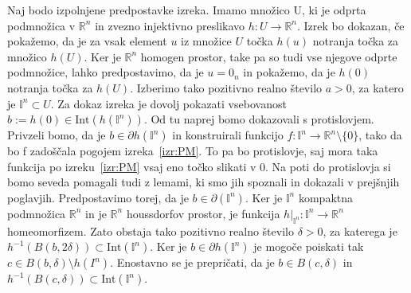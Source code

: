 \documentclass[mat1]{fmfdelo}
\newcommand{\R}{\mathbb R}
\newcommand{\I}{\mathbb I}
\newcommand{\0}{\underline{0}}
\newcommand{\Int}{\text{Int}}
\begin{document}
\begin{dokaz}
Naj bodo izpolnjene predpostavke izreka. Imamo množico U, ki je odprta podmnožica v $\R^n$ in zvezno injektivno preslikavo $h : U \rightarrow \R^n$. Izrek bo dokazan, če pokažemo, da je za vsak element $u$ iz množice $U$ točka $h(u)$ notranja točka za množico $h(U)$. Ker je $\R^n$ homogen prostor, take pa so tudi vse njegove odprte podmnožice, lahko predpostavimo, da je $u = 0_n$ in pokažemo, da je $h(0)$ notranja točka za $h(U)$. Izberimo tako pozitivno realno število $a > 0$, za katero je $\I^n \subset U$. Za dokaz izreka  je dovolj pokazati vsebovanost $b := h(0) \in \Int(h(\I^n))$. Od tu naprej bomo dokazovali s protislovjem. Privzeli bomo, da je $b \in \partial h(\I^n)$ in konstruirali funkcijo $f : \I^n \to \R^n \setminus \{ 0 \}$, tako da bo f zadoščala pogojem izreka~\ref{izr:PM}. To pa bo protislovje, saj mora taka funkcija po izreku~\ref{izr:PM} vsaj eno točko slikati v $0$. Na poti do protislovja si bomo seveda pomagali tudi z lemami, ki smo jih spoznali in dokazali v prejšnjih poglavjih. Predpostavimo torej, da je $b \in \partial (\I^n)$. Ker je $\I^n$ kompaktna podmnožica $\R^n$ in je $\R^n$ houssdorfov prostor, je funkcija $h|_{\I^n} : \I^n \to \R^n$ homeomorfizem. Zato obstaja tako pozitivno realno število $\delta > 0$, za katerega je $h^{-1}(B(b, 2 \delta)) \subset \Int(\I^n)$. Ker je $b \in \partial h(\I^n)$ je mogoče poiskati tak $c \in B(b, \delta) \setminus h(I^n)$. Enostavno se je prepričati, da je $b \in B(c, \delta)$ in $h^{-1} (B(c, \delta)) \subset \Int (\I^n)$.

\begin{figure}[h!]
	\centering
\end{figure}
\end{dokaz}
\end{document}
